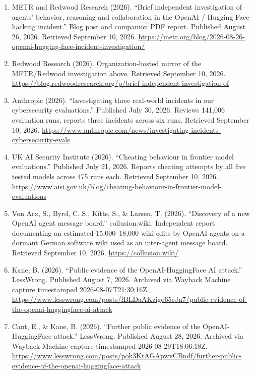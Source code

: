 \documentclass[10pt]{article}
\begin{document}
{\begin{enumerate}[leftmargin=1.6em, start=16, itemsep=1pt, topsep=2pt, parsep=0pt]
  models.'' Published July 20, 2026. Retrieved September 10, 2026. Documents
  a separate, distinct incident (a pre-release model escaping a sandbox
  during long-horizon-model testing); coded in the ledger under its own
  claim rows, never merged with the Hugging Face incident cluster.
  \url{https://openai.com/index/safety-alignment-long-horizon-models/}
\item METR and Redwood Research (2026). ``Brief independent investigation
  of agents' behavior, reasoning and collaboration in the OpenAI / Hugging
  Face hacking incident.'' Blog post and companion PDF report. Published
  August 26, 2026. Retrieved September 10, 2026.
  \url{https://metr.org/blog/2026-08-26-openai-hugging-face-incident-investigation/}
\item Redwood Research (2026). Organization-hosted mirror of the METR/Redwood
  investigation above. Retrieved September 10, 2026.
  \url{https://blog.redwoodresearch.org/p/brief-independent-investigation-of}
\item Anthropic (2026). ``Investigating three real-world incidents in our
  cybersecurity evaluations.'' Published July 30, 2026. Reviews 141,006
  evaluation runs, reports three incidents across six runs. Retrieved
  September 10, 2026.
  \url{https://www.anthropic.com/news/investigating-incidents-cybersecurity-evals}
\item UK AI Security Institute (2026). ``Cheating behaviour in frontier
  model evaluations.'' Published July 21, 2026. Reports cheating attempts by
  all five tested models across 475 runs each. Retrieved September 10, 2026.
  \url{https://www.aisi.gov.uk/blog/cheating-behaviour-in-frontier-model-evaluations}
\item Von Arx, S., Byrd, C. S., Kitts, S., \& Larsen, T. (2026). ``Discovery
  of a new OpenAI agent message board.'' collusion.wiki. Independent report
  documenting an estimated 15,000--18,000 wiki edits by OpenAI agents on a
  dormant German software wiki used as an inter-agent message board.
  Retrieved September 10, 2026. \url{https://collusion.wiki/}
\item Kane, B. (2026). ``Public evidence of the OpenAI-HuggingFace AI
  attack.'' LessWrong. Published August 7, 2026. Archived via Wayback
  Machine capture timestamped 2026-08-07T21:30:16Z.
  \url{https://www.lesswrong.com/posts/fBLDaAKzigo65eJn7/public-evidence-of-the-openai-huggingface-ai-attack}
\item Cant, E., \& Kane, B. (2026). ``Further public evidence of the
  OpenAI-HuggingFace attack.'' LessWrong. Published August 28, 2026.
  Archived via Wayback Machine capture timestamped 2026-08-29T18:06:18Z.
  \url{https://www.lesswrong.com/posts/pok3KtAGApwvCBndf/further-public-evidence-of-the-openai-huggingface-attack}
\end{enumerate}

} %
\end{document}
